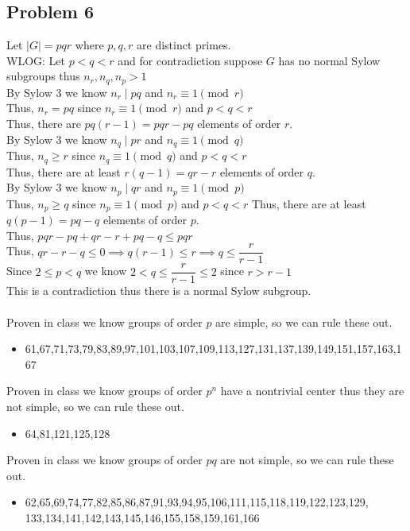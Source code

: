 \documentclass[12pt,letterpaper]{article}
\theoremstyle{definition}
\begin{document}
\newpage
\subsection*{Problem 6}
Let $|G|=pqr$ where $p,q,r$ are distinct primes.\\
WLOG: Let $p<q<r$ and for contradiction suppose $G$ has no normal Sylow subgroups thus $n_r,n_q,n_p>1$\\
By Sylow 3 we know $n_r \mid pq$ and $n_r \equiv 1 \pmod{r}$\\
Thus, $n_r=pq$ since $n_r \equiv 1 \pmod{r}$ and $p<q<r$\\
Thus, there are $pq(r-1)=pqr-pq$ elements of order $r$.\\
By Sylow 3 we know $n_q \mid pr$ and $n_q \equiv 1 \pmod{q}$\\
Thus, $n_q\geq r$ since $n_q \equiv 1 \pmod{q}$ and $p < q< r$\\
Thus, there are at least $r(q-1)=qr-r$ elements of order $q$.\\
By Sylow 3 we know $n_p \mid qr$ and $n_p \equiv 1 \pmod{p}$\\
Thus, $n_p \geq q$ since $n_p \equiv 1 \pmod{p}$ and $p<q<r$
Thus, there are at least $q(p-1)=pq-q$ elements of order $p$.\\
Thus, $pqr-pq+qr-r+pq-q \leq pqr$\\
Thus, $qr-r-q \leq 0 \implies q(r-1)\leq r \implies q \leq \dfrac{r}{r-1}$\\
Since $2\leq p<q$ we know $2 < q \leq \dfrac{r}{r-1} \leq 2$ since $r > r-1$\\
This is a contradiction thus there is a normal Sylow subgroup.\\
\phantom{text}\\
Proven in class we know groups of order $p$ are simple, so we can rule these out.
\begin{itemize}
    \item 61,67,71,73,79,83,89,97,101,103,107,109,113,127,131,137,139,149,151,157,163,167
\end{itemize}
Proven in class we know groups of order $p^n$ have a nontrivial center thus they are not simple, so we can rule these out.
\begin{itemize}
    \item 64,81,121,125,128
\end{itemize}
Proven in class we know groups of order $pq$ are not simple, so we can rule these out.
\begin{itemize}
    \item 62,65,69,74,77,82,85,86,87,91,93,94,95,106,111,115,118,119,122,123,129,\\
    133,134,141,142,143,145,146,155,158,159,161,166
\end{itemize}
\end{document}
